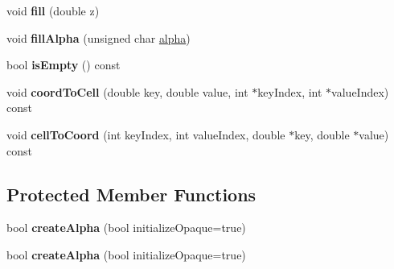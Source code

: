 \begin{DoxyCompactItemize}
\item 
void {\bfseries fill} (double z)\hypertarget{class_q_c_p_color_map_data_a350f783260eb9b5de5c7b5e0d5d3e3c2}{}\label{class_q_c_p_color_map_data_a350f783260eb9b5de5c7b5e0d5d3e3c2}

\item 
void {\bfseries fill\+Alpha} (unsigned char \hyperlink{class_q_c_p_color_map_data_a4f7e6b7a97017400cbbd46f0660e68ea}{alpha})\hypertarget{class_q_c_p_color_map_data_a93e2a549d7702bc849cd48a585294657}{}\label{class_q_c_p_color_map_data_a93e2a549d7702bc849cd48a585294657}

\item 
bool {\bfseries is\+Empty} () const \hypertarget{class_q_c_p_color_map_data_a986009324aee1fc5f696db46bd03dde5}{}\label{class_q_c_p_color_map_data_a986009324aee1fc5f696db46bd03dde5}

\item 
void {\bfseries coord\+To\+Cell} (double key, double value, int $\ast$key\+Index, int $\ast$value\+Index) const \hypertarget{class_q_c_p_color_map_data_a26e33c5ec7094b60136350bcd77d3737}{}\label{class_q_c_p_color_map_data_a26e33c5ec7094b60136350bcd77d3737}

\item 
void {\bfseries cell\+To\+Coord} (int key\+Index, int value\+Index, double $\ast$key, double $\ast$value) const \hypertarget{class_q_c_p_color_map_data_ac96d6e84befe7b9951b5da6d4d4a2a47}{}\label{class_q_c_p_color_map_data_ac96d6e84befe7b9951b5da6d4d4a2a47}

\end{DoxyCompactItemize}
\subsection*{Protected Member Functions}
\begin{DoxyCompactItemize}
\item 
bool {\bfseries create\+Alpha} (bool initialize\+Opaque=true)\hypertarget{class_q_c_p_color_map_data_a42c2b1c303683515fa4de4c551f54441}{}\label{class_q_c_p_color_map_data_a42c2b1c303683515fa4de4c551f54441}

\item 
bool {\bfseries create\+Alpha} (bool initialize\+Opaque=true)\hypertarget{class_q_c_p_color_map_data_a42c2b1c303683515fa4de4c551f54441}{}\label{class_q_c_p_color_map_data_a42c2b1c303683515fa4de4c551f54441}

\end{DoxyCompactItemize}
